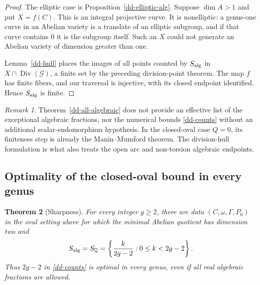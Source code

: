 \documentclass[11pt,a4paper]{article}
\newtheorem{theorem}{Theorem}[section]
\theoremstyle{definition}
\theoremstyle{remark}
\newtheorem{remark}[theorem]{Remark}
\numberwithin{equation}{section}
\begin{document}
\begin{proof}
The elliptic case is Proposition~\ref{dd-elliptic-alg}.  Suppose
$\dim A>1$ and put $X=f(C)$.  This is an integral projective curve.
It is nonelliptic: a genus-one curve in an Abelian variety is a
translate of an elliptic subgroup, and if that curve contains $0$ it
is the subgroup itself.  Such an $X$ could not generate an Abelian
variety of dimension greater than one.

Lemma~\ref{dd-hull} places the images of all points counted by
$S_{\rm alg}$ in
$X\cap\operatorname{Div}(\mathcal G)$, a finite set by the preceding
division-point theorem.  The map $f$ has finite fibers, and our
traversal is injective, with its closed endpoint identified.  Hence
$S_{\rm alg}$ is finite.
\end{proof}

\begin{remark}\label{dd-effective-scope}
Theorem~\ref{dd-all-algebraic} does not provide an effective list of
the exceptional algebraic fractions, nor the numerical bounds
\eqref{dd-counts} without an additional scalar-endomorphism
hypothesis.  In the closed-oval case $Q=0$, its finiteness step is
already the Manin--Mumford theorem.  The division-hull formulation is
what also treats the open arc and non-torsion algebraic endpoints.
\end{remark}

\subsection{Optimality of the closed-oval bound in every genus}

\begin{theorem}[Sharpness]\label{dd-sharp}
For every integer $g\ge2$, there are data $(C,\omega,\Gamma,P_0)$ in
the oval setting above for which the minimal Abelian quotient has
dimension two and
\begin{equation}\label{dd-sharp-set}
 S_{\rm alg}=S_{\mathbb Q}
 =\left\{\frac{k}{2g-2}:0\le k<2g-2\right\}.
\end{equation}
Thus $2g-2$ in \eqref{dd-counts} is optimal in every genus, even if
all real algebraic fractions are allowed.
\end{theorem}
\end{document}

